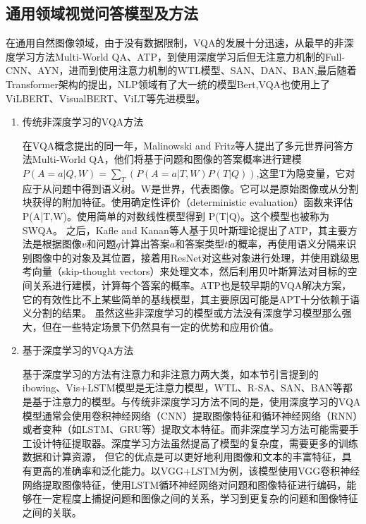 \subsection{通用领域视觉问答模型及方法}
在通用自然图像领域，由于没有数据限制，VQA的发展十分迅速，从最早的非深度学习方法Multi-World QA\cite{malinowski2014multi}、ATP\cite{kafle2016answer}，到使用深度学习后但无注意力机制的Full-CNN\cite{ma2016learning}、AYN\cite{malinowski2017ask}，进而到使用注意力机制的WTL模型\cite{zitnick2014edge}、SAN、DAN\cite{nam2017dual}、BAN,最后随着Transformer架构的提出，NLP领域有了大一统的模型Bert\cite{devlin2018bert},VQA也使用上了ViLBERT\cite{lu2019vilbert}、VisualBERT\cite{li2019visualbert}、ViLT\cite{kim2021vilt}等先进模型。
\begin{enumerate}[topsep = 0 pt, itemsep= 0 pt, parsep=0pt, partopsep=0pt, leftmargin=44pt, itemindent=0pt, labelsep=6pt, label=(\arabic*)]
    \item 传统非深度学习的VQA方法 
    
    在VQA概念提出的同一年，Malinowski and Fritz等人提出了多元世界问答方法Multi-World QA，他们将基于问题和图像的答案概率进行建模$P(A = a|Q,W) = \sum_T(P(A=a|T,W)P(T|Q))$,这里T为隐变量，它对应于从问题中得到语义树。W是世界，代表图像。它可以是原始图像或从分割块获得的附加特征。使用确定性评价（deterministic evaluation）函数来评估 P(A|T,W)。使用简单的对数线性模型得到 P(T|Q)。这个模型也被称为SWQA。
    之后，Kafle and Kanan等人基于贝叶斯理论提出了ATP，其主要方法是根据图像$v$和问题$q$计算出答案$a$和答案类型$t$的概率，再使用语义分隔来识别图像中的对象及其位置，接着用ResNet对这些对象进行处理，并使用跳级思考向量（skip-thought vectors）来处理文本，然后利用贝叶斯算法对目标的空间关系进行建模，计算每个答案的概率。ATP也是较早期的VQA解决方案，它的有效性比不上某些简单的基线模型，其主要原因可能是APT十分依赖于语义分割的结果。
    虽然这些非深度学习的模型或方法没有深度学习模型那么强大，但在一些特定场景下仍然具有一定的优势和应用价值。
    \item 基于深度学习的VQA方法

    基于深度学习的方法有注意力和非注意力两大类，如本节引言提到的ibowing、Vis+LSTM模型是无注意力模型，WTL、R-SA、SAN、BAN等都是基于注意力的模型。与传统非深度学习方法不同的是，使用深度学习的VQA模型通常会使用卷积神经网络（CNN）提取图像特征和循环神经网络（RNN）或者变种（如LSTM、GRU等）提取文本特征。而非深度学习方法可能需要手工设计特征提取器。深度学习方法虽然提高了模型的复杂度，需要更多的训练数据和计算资源，
    但它的优点是可以更好地利用图像和文本的丰富特征，具有更高的准确率和泛化能力。以VGG+LSTM为例，该模型使用VGG卷积神经网络提取图像特征，使用LSTM循环神经网络对问题和图像特征进行编码，能够在一定程度上捕捉问题和图像之间的关系，学习到更复杂的问题和图像特征之间的关联。
\end{enumerate}

